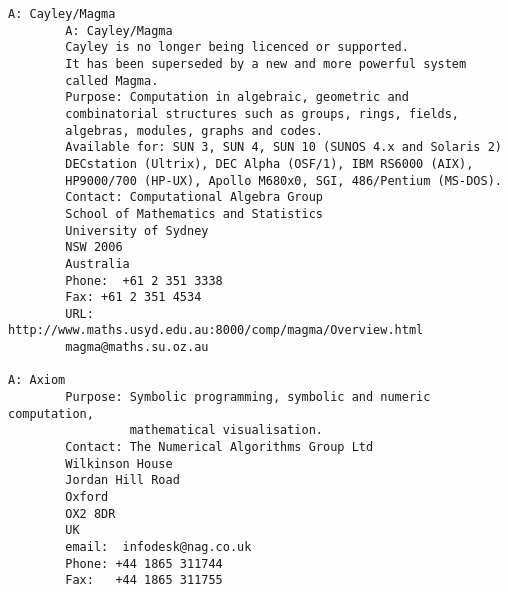 \begin{verbatim}
A: Cayley/Magma
        A: Cayley/Magma
        Cayley is no longer being licenced or supported.
        It has been superseded by a new and more powerful system
        called Magma.
        Purpose: Computation in algebraic, geometric and
        combinatorial structures such as groups, rings, fields,
        algebras, modules, graphs and codes.
        Available for: SUN 3, SUN 4, SUN 10 (SUNOS 4.x and Solaris 2)
        DECstation (Ultrix), DEC Alpha (OSF/1), IBM RS6000 (AIX),
        HP9000/700 (HP-UX), Apollo M680x0, SGI, 486/Pentium (MS-DOS).
        Contact: Computational Algebra Group
        School of Mathematics and Statistics
        University of Sydney
        NSW 2006
        Australia
        Phone:  +61 2 351 3338
        Fax: +61 2 351 4534
        URL: http://www.maths.usyd.edu.au:8000/comp/magma/Overview.html
        magma@maths.su.oz.au

A: Axiom
        Purpose: Symbolic programming, symbolic and numeric computation,
                 mathematical visualisation.
        Contact: The Numerical Algorithms Group Ltd
        Wilkinson House
        Jordan Hill Road
        Oxford
        OX2 8DR
        UK
        email:  infodesk@nag.co.uk
        Phone: +44 1865 311744
        Fax:   +44 1865 311755
\end{verbatim}
